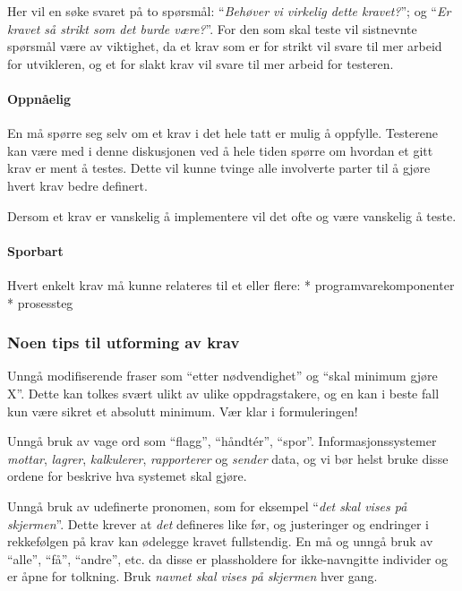 Her vil en søke svaret på to spørsmål: ``\emph{Behøver vi virkelig dette
kravet?}''; og ``\emph{Er kravet så strikt som det burde være?}''. For
den som skal teste vil sistnevnte spørsmål være av viktighet, da et krav
som er for strikt vil svare til mer arbeid for utvikleren, og et for
slakt krav vil svare til mer arbeid for testeren.

\paragraph{Oppnåelig}

En må spørre seg selv om et krav i det hele tatt er mulig å oppfylle.
Testerene kan være med i denne diskusjonen ved å hele tiden spørre om
hvordan et gitt krav er ment å testes. Dette vil kunne tvinge alle
involverte parter til å gjøre hvert krav bedre definert.

Dersom et krav er vanskelig å implementere vil det ofte og være
vanskelig å teste.

\paragraph{Sporbart}

Hvert enkelt krav må kunne relateres til et eller flere: *
programvarekomponenter * prosessteg

\subsubsection{Noen tips til utforming av krav}

Unngå modifiserende fraser som ``etter nødvendighet'' og ``skal minimum
gjøre X''. Dette kan tolkes svært ulikt av ulike oppdragstakere, og en
kan i beste fall kun være sikret et absolutt minimum. Vær klar i
formuleringen!

Unngå bruk av vage ord som ``flagg'', ``håndtér'', ``spor''.
Informasjonssystemer \emph{mottar}, \emph{lagrer}, \emph{kalkulerer},
\emph{rapporterer} og \emph{sender} data, og vi bør helst bruke disse
ordene for beskrive hva systemet skal gjøre.

Unngå bruk av udefinerte pronomen, som for eksempel ``\emph{det skal
vises på skjermen}''. Dette krever at \emph{det} defineres like før, og
justeringer og endringer i rekkefølgen på krav kan ødelegge kravet
fullstendig. En må og unngå bruk av ``alle'', ``få'', ``andre'', etc. da
disse er plassholdere for ikke-navngitte individer og er åpne for
tolkning. Bruk \emph{navnet skal vises på skjermen} hver gang.

